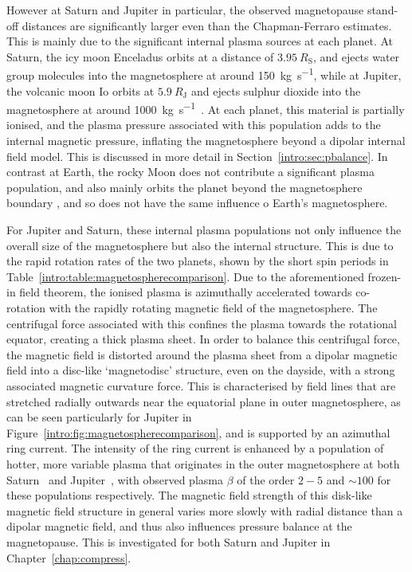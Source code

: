 {However at Saturn and Jupiter in particular, the observed magnetopause stand-off distances are significantly larger even than the Chapman-Ferraro estimates. This is mainly due to the significant internal plasma sources at each planet. At Saturn, the icy moon Enceladus orbits at a distance of $\SI{3.95}{R_\mathrm{S}}$, and ejects water group molecules into the magnetosphere at around \SI{150}{kg s^{-1}}, while at Jupiter, the volcanic moon Io orbits at $\SI{5.9}{R_\mathrm{J}}$ and ejects sulphur dioxide into the magnetosphere at around \SI{1000}{kg s^{-1}}~\citep{bagenal2011}. At each planet, this material is partially ionised, and the plasma pressure associated with this population adds to the internal magnetic pressure, inflating the magnetosphere beyond a dipolar internal field model. This is discussed in more detail in Section~\ref{intro:sec:pbalance}. In contrast at Earth, the rocky Moon does not contribute a significant plasma population, and also mainly orbits the planet beyond the magnetosphere boundary \citep[e.g.][]{schneider1967}, and so does not have the same influence o Earth's magnetosphere.

For Jupiter and Saturn, these internal plasma populations not only influence the overall size of the magnetosphere but also the internal structure. This is due to the rapid rotation rates of the two planets, shown by the short spin periods in Table~\ref{intro:table:magnetospherecomparison}. Due to the aforementioned frozen-in field theorem, the ionised plasma is azimuthally accelerated towards co-rotation with the rapidly rotating magnetic field of the magnetosphere. The centrifugal force associated with this confines the plasma towards the rotational equator, creating a thick plasma sheet. In order to balance this centrifugal force, the magnetic field is distorted around the plasma sheet from a dipolar magnetic field into a disc-like `magnetodisc' structure, even on the dayside, with a strong associated magnetic curvature force. This is characterised by field lines that are stretched radially outwards near the equatorial plane in outer magnetosphere, as can be seen particularly for Jupiter in Figure~\ref{intro:fig:magnetospherecomparison}, and is supported by an azimuthal ring current. The intensity of the ring current is enhanced by a population of hotter, more variable plasma that originates in the outer magnetosphere at both Saturn~\citep[e.g.][]{sergis2010} and Jupiter~\citep[e.g.][]{mauk2004}, with observed plasma $\beta$ of the order $2-5$ and ${\sim}100$ for these populations respectively. The magnetic field strength of this disk-like magnetic field structure in general varies more slowly with radial distance than a dipolar magnetic field, and thus also influences pressure balance at the magnetopause. This is investigated for both Saturn and Jupiter in Chapter~\ref{chap:compress}. 

}

